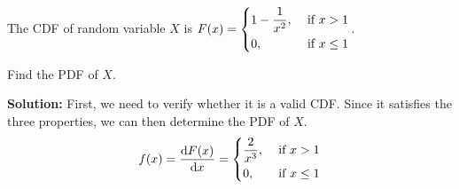 \begin{eg}
    The CDF of random variable \(X\) is \(F(x) = \begin{dcases}
        1 - \frac{1}{x^2}, &\text{ if } x > 1 \\
        0, &\text{ if } x \leq 1 
    \end{dcases}\). 
    
    Find the PDF of \(X\).

    \textbf{Solution:} 
    First, we need to verify whether it is a valid CDF. Since it satisfies the three properties, we can then determine the PDF of \(X\).
    \[
        f(x) = \frac{\mathrm{d}F(x)}{\mathrm{d}x} = \begin{dcases}
            \dfrac{2}{x^3}, &\text{ if } x > 1 \\
            0 , &\text{ if } x \leq 1 
        \end{dcases}
    \]

\end{eg}


